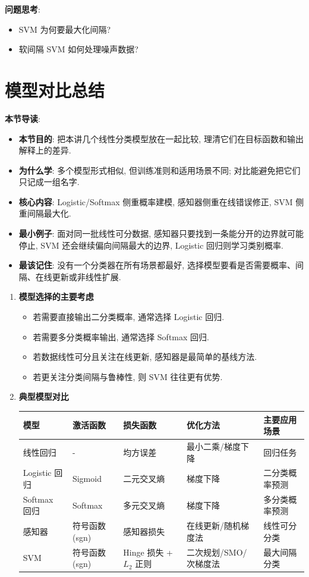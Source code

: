 \documentclass{../nndlcourse}
\begin{document}
\textbf{问题思考}:
\begin{itemize}
    \item SVM 为何要最大化间隔?
    \item 软间隔 SVM 如何处理噪声数据?
\end{itemize}

\section{模型对比总结}
\textbf{本节导读}:
\begin{itemize}
    \item \textbf{本节目的}: 把本讲几个线性分类模型放在一起比较, 理清它们在目标函数和输出解释上的差异.
    \item \textbf{为什么学}: 多个模型形式相似, 但训练准则和适用场景不同; 对比能避免把它们只记成一组名字.
    \item \textbf{核心内容}: Logistic/Softmax 侧重概率建模, 感知器侧重在线错误修正, SVM 侧重间隔最大化.
    \item \textbf{最小例子}: 面对同一批线性可分数据, 感知器只要找到一条能分开的边界就可能停止, SVM 还会继续偏向间隔最大的边界, Logistic 回归则学习类别概率.
    \item \textbf{最该记住}: 没有一个分类器在所有场景都最好, 选择模型要看是否需要概率、间隔、在线更新或非线性扩展.
\end{itemize}

\begin{enumerate}
    \item \textbf{模型选择的主要考虑}
    \begin{itemize}
        \item 若需要直接输出二分类概率, 通常选择 Logistic 回归.
        \item 若需要多分类概率输出, 通常选择 Softmax 回归.
        \item 若数据线性可分且关注在线更新, 感知器是最简单的基线方法.
        \item 若更关注分类间隔与鲁棒性, 则 SVM 往往更有优势.
    \end{itemize}
    \item \textbf{典型模型对比}
    \begin{center}
    \begin{tabular}{|l|l|l|l|l|}
    \hline
    模型 & 激活函数 & 损失函数 & 优化方法 & 主要应用场景 \\
    \hline
    线性回归 & - & 均方误差 & 最小二乘/梯度下降 & 回归任务 \\
    Logistic 回归 & Sigmoid & 二元交叉熵 & 梯度下降 & 二分类概率预测 \\
    Softmax 回归 & Softmax & 多元交叉熵 & 梯度下降 & 多分类概率预测 \\
    感知器 & 符号函数(sgn) & 感知器损失 & 在线更新/随机梯度法 & 线性可分分类 \\
    SVM & 符号函数(sgn) & Hinge 损失 + $L_2$ 正则 & 二次规划/SMO/次梯度法 & 最大间隔分类 \\
    \hline
    \end{tabular}
    \end{center}
\end{enumerate}
\end{document}
